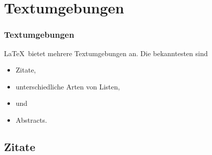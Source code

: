 \section{Textumgebungen}


\begin{frame}[fragile]
\frametitle{Textumgebungen}
\LaTeX\ bietet mehrere Textumgebungen an. Die bekanntesten sind 

\begin{itemize}
	\item Zitate, 
	
	\item unterschiedliche Arten von Listen, 
	
	\item {} und 
	
	\item Abstracts.
\end{itemize}

\end{frame}


\subsection{Zitate}

